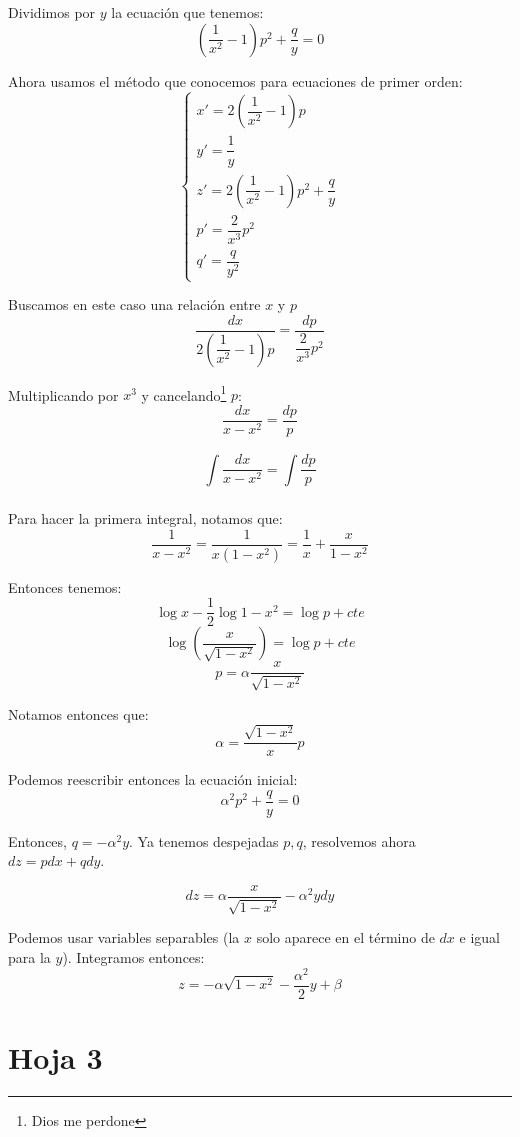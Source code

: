 \documentclass[openany]{book}
\begin{document}
\setcounter{ex}{9}
\begin{exercise}
  $  $

  Dividimos por $ y $ la ecuación que tenemos:
  $$ (\dfrac{1}{x^2}-1)p^2 +\dfrac{q}{y} = 0 $$

  Ahora usamos el método que conocemos para ecuaciones de primer orden:
  $$ \left\{
  \begin{array}{l}
    x'=2\left(\dfrac{1}{x^2}-1\right)p\\ 
    y'=\dfrac{1}{y}\\ 
    z'=2\left(\dfrac{1}{x^2}-1\right)p^2+\dfrac{q}{y}\\ 
    p'=\dfrac{2}{x^3}p^2\\ 
    q'=\dfrac{q}{y^2}
  \end{array}
  \right. $$

  Buscamos en este caso una relación entre $ x $ y $ p $
  $$ \dfrac{dx}{2\left(\dfrac{1}{x^2}-1\right)p} = \dfrac{dp}{\dfrac{2}{x^3}p^2} $$

  Multiplicando por $ x^3 $ y cancelando\footnote{Dios me perdone} $ p $:
  $$ \dfrac{dx}{x-x^2} = \dfrac{dp}{p} $$

  $$ \int\limits_{}^{}\dfrac{dx}{x-x^2}= \int\limits_{}^{}\dfrac{dp}{p} $$


  Para hacer la primera integral, notamos que:
  $$ \dfrac{1}{x-x^2} = \dfrac{1}{x(1-x^2)} = \dfrac{1}{x}+\dfrac{x}{1-x^2} $$

  Entonces tenemos:
  $$ \log{x}-\dfrac{1}{2}\log{1-x^2}=\log{p}+cte $$
  $$ \log{\left(\dfrac{x}{\sqrt{1-x^2}}\right)} = \log{p}+cte $$
  $$ p = \alpha \dfrac{x}{\sqrt{1-x^2}} $$

  Notamos entonces que:
  $$ \alpha = \dfrac{\sqrt{1-x^2}}{x}p $$

  Podemos reescribir entonces la ecuación inicial:
  $$ \alpha ^2p^2+\dfrac{q}{y} = 0 $$

  Entonces, $ q = -\alpha ^2y $. Ya tenemos despejadas $ p,q $, resolvemos ahora $ dz=pdx+qdy $.

  $$ dz = \alpha \dfrac{x}{\sqrt{1-x^2}} -\alpha^2ydy $$

  Podemos usar variables separables (la $ x $ solo aparece en el término de $ dx $ e igual para la $ y $). Integramos entonces:
  $$ z = -\alpha \sqrt{1-x^2} - \dfrac{\alpha^2}{2}y+\beta  $$



\end{exercise}


\section{Hoja 3}
\end{document}
